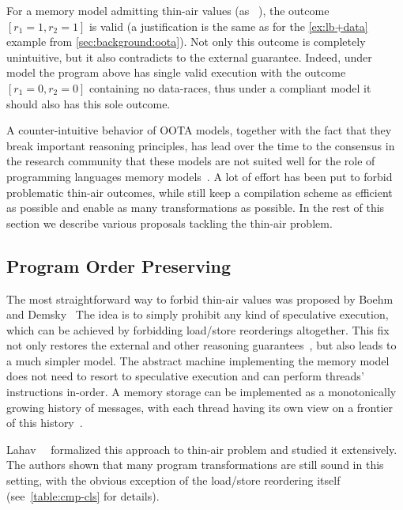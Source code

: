For a memory model admitting thin-air values 
(as \eg \CMM~\cite{Batty-al:POPL11}), 
the outcome ${[r_1=1, r_2=1]}$ is valid
(a justification is the same as for 
the \ref{ex:lb+data} example from \cref{sec:background:oota}).
Not only this outcome is completely unintuitive,
but it also contradicts to the external \DRF guarantee.
Indeed, under \SC model the program above has 
single valid execution with the outcome $[r_1=0, r_2=0]$ 
containing no data-races, thus under a \DRF compliant model 
it should also has this sole outcome.  

A counter-intuitive behavior of OOTA models, 
together with the fact that they break 
important reasoning principles,
has lead over the time to the consensus 
in the research community that these models 
are not suited well for the role of 
programming languages memory models~\cite{Boehm-Demsky:MSPC14, Batty-al:ESOP15}.
A lot of effort has been put to forbid problematic 
thin-air outcomes, while still keep a 
compilation scheme as efficient as possible
and enable as many transformations as possible.
In the rest of this section we describe various proposals 
tackling the thin-air problem. 

\subsection{Program Order Preserving}
\label{sec:analysis:porf}

The most straightforward way to forbid thin-air values 
was proposed by Boehm and Demsky~\cite{Boehm-Demsky:MSPC14}
The idea is to simply prohibit any kind of speculative execution, 
which can be achieved by forbidding load/store reorderings altogether. 
This fix not only restores the external \DRF
and other reasoning guarantees~\cite{Lahav-al:PLDI17}, 
but also leads to a much simpler model. 
The abstract machine implementing 
the memory model does not need to resort to speculative execution 
and can perform threads' instructions in-order. 
A memory storage can be implemented as a 
monotonically growing history of messages, 
with each thread having its own view on 
a frontier of this history~\cite{Dolan-al:PLDI18, Doherty-al:PPoPP19}.

Lahav~\etal~\cite{Lahav-al:PLDI17} formalized this approach
to thin-air problem and studied it extensively. 
The authors shown that many program transformations 
are still sound in this setting, 
with the obvious exception of the load/store reordering itself
(see~\cref{table:cmp-cls} for details).

